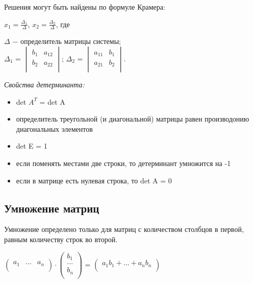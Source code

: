 	Решения могут быть найдены по $\textit{формуле Крамера}$:
	
	\begin{center}
	$	x_1 =\frac{\Delta_1}{\Delta}$, $x_2 = \frac{\Delta_2}{\Delta}$, где
	\end{center}
	$\Delta$ $-$ определитель матрицы системы;\\
	$\Delta_1$ = 
	$\begin{vmatrix}
		b_1 & a_{12}\\
		b_2 & a_{22}\\
	\end{vmatrix}$;
	$\Delta_2$ = 
	$\begin{vmatrix}
		a_{11} & b_1\\
		a_{21} & b_2\\
	\end{vmatrix}$.\\
	
	\newline
	
	\textit{Свойства детерминанта:}
	\begin{itemize}
		\item det $A^T$ = det A
		\item определитель треугольной (и диагональной) матрицы равен производонию диагональных элементов
		\item det E = 1
		\item если поменять местами две строки, то детерминант умножится на -1
		\item если в матрице есть нулевая строка, то det A = 0
	\end{itemize}
		
	\subsection{Умножение матриц}
	
	Умножение определено только для матриц с количеством столбцов в первой, равным количеству строк во второй.
	
	\begin{center}
		$\begin{pmatrix}
			a_1 & ... & a_n\\
	    \end{pmatrix}\cdot 
		\begin{pmatrix*}
			b_1\\
			...\\
			b_n\\
		\end{pmatrix*}$ = 
		$\begin{pmatrix*}
			a_1 b_1 + ... + a_n b_n\\
		\end{pmatrix*}$
	\end{center}
	
